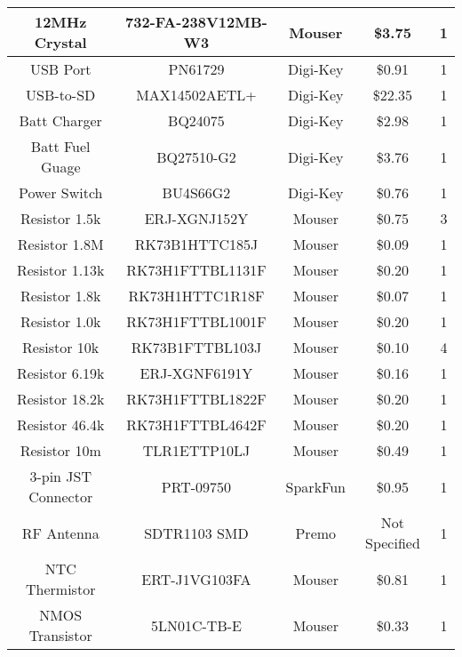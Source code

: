 \begin{center}
\begin{longtable}{|c|c|c|c|c|}
    12MHz Crystal & 732-FA-238V12MB-W3 & Mouser & \$3.75  & 1 \\ \hline
    USB Port & PN61729 & Digi-Key & \$0.91  & 1 \\ \hline
    USB-to-SD & MAX14502AETL+ & Digi-Key & \$22.35  & 1 \\ \hline
    Batt Charger & BQ24075  & Digi-Key & \$2.98  & 1 \\ \hline
    Batt Fuel Guage & BQ27510-G2 & Digi-Key & \$3.76  & 1 \\ \hline
    Power Switch & BU4S66G2 & Digi-Key & \$0.76  & 1 \\ \hline
    Resistor 1.5k & ERJ-XGNJ152Y & Mouser & \$0.75  & 3 \\ \hline
    Resistor 1.8M & RK73B1HTTC185J & Mouser & \$0.09  & 1 \\ \hline
    Resistor 1.13k & RK73H1FTTBL1131F & Mouser & \$0.20  & 1 \\ \hline
    Resistor 1.8k & RK73H1HTTC1R18F & Mouser & \$0.07  & 1 \\ \hline
    Resistor 1.0k & RK73H1FTTBL1001F & Mouser & \$0.20  & 1 \\ \hline
    Resistor 10k & RK73B1FTTBL103J & Mouser & \$0.10  & 4 \\ \hline
    Resistor 6.19k & ERJ-XGNF6191Y & Mouser & \$0.16  & 1 \\ \hline
    Resistor 18.2k & RK73H1FTTBL1822F & Mouser & \$0.20  & 1 \\ \hline
    Resistor 46.4k & RK73H1FTTBL4642F & Mouser & \$0.20  & 1 \\ \hline
    Resistor 10m & TLR1ETTP10LJ & Mouser & \$0.49  & 1 \\ \hline
    3-pin JST Connector & PRT-09750 & SparkFun & \$0.95  & 1 \\ \hline
    RF Antenna & SDTR1103 SMD & Premo & Not Specified & 1 \\ \hline
    NTC Thermistor	& ERT-J1VG103FA	& Mouser	&\$0.81&	1 \\ \hline
	NMOS Transistor	&5LN01C-TB-E	&Mouser	&\$0.33		&1 \\ \hline

        \end{longtable}
\end{center}


